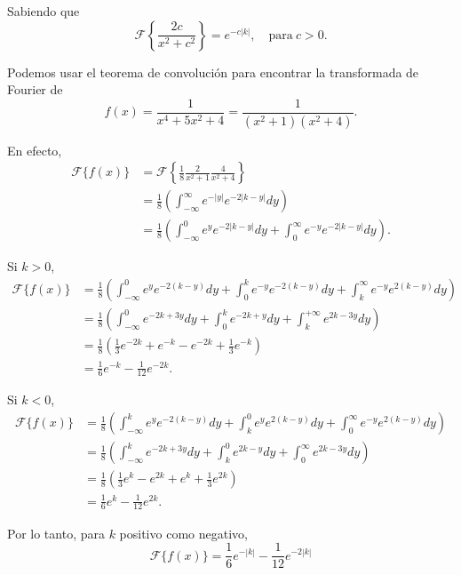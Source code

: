 \begin{ejemplo}
    Sabiendo que \cite{Mauch}
    $$\mathcal{F}\left\{ \frac{2c}{x^2+c^2} \right\} = e^{-c|k|}, \quad \text{para} ~ c > 0.$$

    Podemos usar el teorema de convolución para encontrar la transformada de Fourier de
    \begin{equation}
      f(x) = \frac{1}{x^4+5x^2+4} = \frac{1}{(x^2+1)(x^2+4)}.    \label{EjConvo}
    \end{equation}
  
    En efecto,
    \begin{align*}
        \mathcal{F}\{f(x)\} &=  \mathcal{F}\left\{ \frac{1}{8} \frac{2}{x^2+1} \frac{4}{x^2+4} \right\} \\
        &= \frac{1}{8} \left( \int_{-\infty}^{\infty} e^{-|y|}e^{-2|k-y|} dy \right) \\
        &= \frac{1}{8} \left( \int_{-\infty}^0 e^{y}e^{-2|k-y|} dy +   \int_0^{\infty} e^{-y}e^{-2|k-y|} dy \right).
    \end{align*}

Si $k > 0$,
\begin{align*}
    \mathcal{F}\{f(x)\} &= \frac{1}{8} \left(  \int_{-\infty}^0 e^{y}e^{-2(k-y)} dy +  \int_0^k e^{-y}e^{-2(k-y)} dy + \int_k^{\infty} e^{-y}e^{2(k-y)} dy \right)  \\
    &= \frac{1}{8} \left(  \int_{-\infty}^0 e^{-2k+3y} dy +  \int_0^k e^{-2k+y} dy + \int_k^{+\infty} e^{2k-3y} dy \right) \\
    &= \frac{1}{8} \left( \frac{1}{3} e^{-2k} + e^{-k} - e^{-2k} + \frac{1}{3} e^{-k} \right) \\
    &= \frac{1}{6} e^{-k} - \frac{1}{12} e^{-2k}. 
\end{align*}

Si $k < 0$,
\begin{align*}
    \mathcal{F}\{f(x)\} &= \frac{1}{8} \left(  \int_{-\infty}^k e^{y}e^{-2(k-y)} dy +  \int_k^0 e^{y}e^{2(k-y)} dy + \int_0^{\infty} e^{-y}e^{2(k-y)} dy \right)  \\
    &= \frac{1}{8} \left(  \int_{-\infty}^k e^{-2k+3y} dy +  \int_k^0 e^{2k-y} dy + \int_0^{\infty} e^{2k-3y} dy \right) \\
    &= \frac{1}{8} \left( \frac{1}{3} e^{k} - e^{2k} + e^k + \frac{1}{3} e^{2k} \right) \\
    &= \frac{1}{6} e^{k} - \frac{1}{12} e^{2k}. 
\end{align*}

Por lo tanto, para $k$ positivo como negativo,
$$\boxed{\mathcal{F}\{f(x)\} =  \frac{1}{6} e^{-|k|} - \frac{1}{12} e^{-2|k|}} $$


\end{ejemplo}
